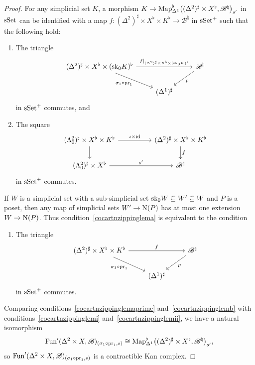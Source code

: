 \documentclass{tac}
\newcommand{\s}[1]{\mathscr{#1}}
\newcommand{\tx}[1]{\textnormal{#1}}
\begin{document}
\begin{proof}
For any simplicial set $K$, a morphism $K \to  \tx{Map}^\flat_{\Delta^1} \big( (\Delta^2)^\sharp \times X^\flat , \s{B}^\natural \big)_{s'} $ in $\tx{sSet}$ can be identified with a map $f:  (\Delta^2)^\sharp \times X^\flat \times K^\flat \to \s{B}^\natural$ in $\tx{sSet}^+$ such that the following hold:
\begin{enumerate}[label=(\alph*)]
\item\label{cocartnzippinglema} The triangle 
\[ \begin{tikzcd}
(\Delta^2)^\sharp \times X^\flat \times (\tx{sk}_0 K)^\flat \arrow[]{dr}[swap]{\sigma_1 \circ \tx{pr}_1} \arrow[]{rr}{f|_{ (\Delta^2)^\sharp \times X^\flat \times (\tx{sk}_0 K)^\flat }} & & \s{B}^\natural \arrow[]{dl}{p} \\ 
& (\Delta^1)^\sharp &
\end{tikzcd}\]
in $\tx{sSet}^+$ commutes, and
\item\label{cocartnzippinglemb} The square
\[\begin{tikzcd}
(\Lambda^2_0)^\sharp \times X^\flat \times K^\flat \arrow[]{d} \arrow[]{rr}{ \iota \times \tx{id}}& & (\Delta^2)^\sharp \times X^\flat \times K^\flat \arrow[]{d}{f}\\
 (\Lambda^2_0)^\sharp \times X^\flat  \arrow[]{rr}{s'}  & & \s{B}^\natural
\end{tikzcd}\]
in $\tx{sSet}^+$ commutes.
\end{enumerate}
If $W$ is a simplicial set with a sub-simplicial set $\tx{sk}_0 W \subseteq W' \subseteq W$ and $P$ is a poset, then any map of simplicial sets $W' \to \tx{N}(P)$ has at most one extension $W \to \tx{N}(P)$.  Thus condition~\ref{cocartnzippinglema} is equivalent to the condition
\begin{enumerate}[label=(\alph*')]
\item\label{cocartnzippinglemaprime} The triangle 
\[ \begin{tikzcd}
(\Delta^2)^\sharp \times X^\flat \times K^\flat \arrow[]{dr}[swap]{\sigma_1 \circ \tx{pr}_1} \arrow[]{rr}{f} & & \s{B}^\natural \arrow[]{dl}{p} \\ 
& (\Delta^1)^\sharp &
\end{tikzcd}\]
in $\tx{sSet}^+$ commutes.
\end{enumerate}
Comparing conditions~\ref{cocartnzippinglemaprime} and~\ref{cocartnzippinglemb} with conditions~\ref{cocartnzippinglemi} and~\ref{cocartnzippinglemii}, we have a natural isomorphism
\[\tx{Fun}' (\Delta^2 \times X,\s{B})_{(\sigma_1 \circ \tx{pr}_1 , s)} \cong \tx{Map}^\flat_{\Delta^1} \big( (\Delta^2)^\sharp \times X^\flat , \s{B}^\natural \big)_{s'}, \]
so $\tx{Fun}' (\Delta^2 \times X,\s{B})_{(\sigma_1 \circ \tx{pr}_1 , s)} $ is a contractible Kan complex.
\end{proof}
\end{document}
